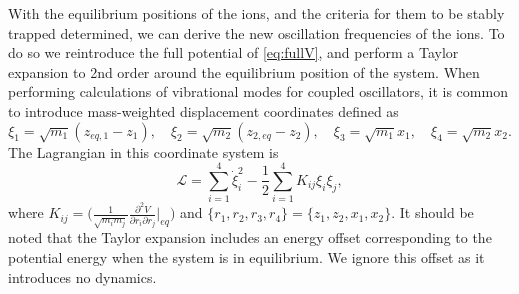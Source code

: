 With the equilibrium positions of the ions, and the criteria for them to be stably trapped determined, we can derive the new oscillation frequencies of the ions. To do so we reintroduce the full potential of \cref{eq:fullV}, and perform a Taylor expansion to 2nd order around the equilibrium position of the system. When performing calculations of vibrational modes for coupled oscillators, it is common to introduce mass-weighted displacement coordinates defined as
\begin{equation}
    \xi_1 = \sqrt{m_1}(z_{eq,1}-z_1),\quad \xi_2 = \sqrt{m_2}(z_{2,eq}-z_2),\quad \xi_3 = \sqrt{m_1}x_1,\quad \xi_4 = \sqrt{m_2}x_2.
\end{equation}
The Lagrangian in this coordinate system is
\begin{equation}
    \mathcal{L} = \sum_{i=1}^4 \dot{\xi}_i^2 - \frac{1}{2} \sum_{i = 1}^4K_{ij}\xi_i\xi_j,
\end{equation}
where $K_{ij} = \bigg(\frac{1}{\sqrt{m_im_j}}\frac{\partial^2 V}{\partial r_i\partial r_j}\bigg\vert_{eq}\bigg)$ and $\{r_1,r_2,r_3,r_4\} = \{z_1,z_2,x_1,x_2\}$. It should be noted that the Taylor expansion includes an energy offset corresponding to the potential energy when the system is in equilibrium. We ignore this offset as it introduces no dynamics.

